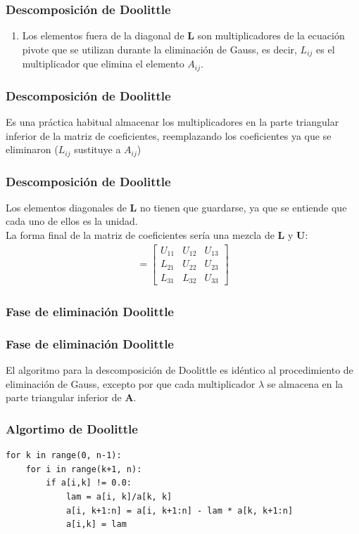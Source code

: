 \documentclass[12pt]{beamer}
\begin{document}
\begin{frame}
\frametitle{Descomposición de Doolittle}
\begin{enumerate}
\conti
\item Los elementos fuera de la diagonal de $\mathbf{L}$ son multiplicadores de la ecuación pivote que se utilizan durante la eliminación de Gauss, es decir, $L_{ij}$ es el multiplicador que elimina el elemento $A_{ij}$.
\end{enumerate}
\end{frame}
\begin{frame}
\frametitle{Descomposición de Doolittle}
Es una práctica habitual almacenar los multiplicadores en la parte triangular inferior de la matriz de coeficientes, reemplazando los coeficientes ya que se eliminaron ($L_{ij}$ sustituye a $A_{ij}$)
\end{frame}
\begin{frame}
\frametitle{Descomposición de Doolittle}
Los elementos diagonales de $\mathbf{L}$ no tienen que guardarse, ya que se entiende que cada uno de ellos es la unidad.
\\
\bigskip
\pause
La forma final de la matriz de coeficientes sería una mezcla de $\mathbf{L}$ y $\mathbf{U}$:
\pause
\begin{align*}
[\mathbf{L \backslash U} ] =
\begin{bmatrix}
U_{11} & U_{12} & U_{13} \\
L_{21} & U_{22} & U_{23} \\
L_{31} & L_{32} & U_{33}
\end{bmatrix}
\end{align*}
\end{frame}

\subsubsection{Fase de eliminación Doolittle}

\begin{frame}[fragile]
\frametitle{Fase de eliminación Doolittle}
El algoritmo para la descomposición de Doolittle es idéntico al procedimiento de eliminación de Gauss, excepto por que cada multiplicador $\lambda$ se almacena en la parte triangular inferior de $\mathbf{A}$.
\end{frame}
\begin{frame}[fragile]
\frametitle{Algortimo de Doolittle}
\begin{lstlisting}[caption=Código para obtener las matrices LU]
for k in range(0, n-1):
    for i in range(k+1, n):
        if a[i,k] != 0.0:
            lam = a[i, k]/a[k, k]
            a[i, k+1:n] = a[i, k+1:n] - lam * a[k, k+1:n]
            a[i,k] = lam
\end{lstlisting}
\end{frame}
\end{document}
